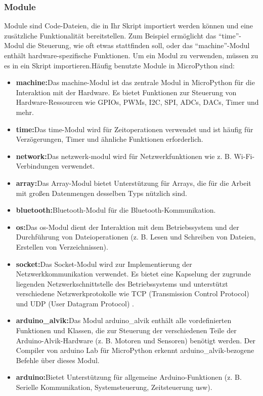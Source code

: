 \subsubsection{Module}
Module sind Code-Dateien, die in Ihr Skript importiert werden können und eine zusätzliche Funktionalität bereitstellen. Zum Beispiel ermöglicht das ``time''-Modul die Steuerung, wie oft etwas stattfinden soll, oder das ``machine''-Modul enthält hardware-spezifische Funktionen. Um ein Modul zu verwenden, müssen zu es in ein Skript importieren.Häufig benutzte Module in MicroPython sind:
\begin{itemize}
	\item \textbf{machine:}Das machine-Modul ist das zentrale Modul in MicroPython für die Interaktion mit der Hardware. Es bietet Funktionen zur Steuerung von Hardware-Ressourcen wie GPIOs, PWMs, I2C, SPI, ADCs, DACs, Timer und mehr.
	\item \textbf{time:}Das time-Modul wird für Zeitoperationen verwendet und ist häufig für Verzögerungen, Timer und ähnliche Funktionen erforderlich.
	\item \textbf{network:}Das netzwerk-modul wird für Netzwerkfunktionen wie z. B. Wi-Fi-Verbindungen verwendet.
	\item \textbf{array:}Das Array-Modul bietet Unterstützung für Arrays, die für die Arbeit mit gro\ss en Datenmengen desselben Typs nützlich sind.
	\item \textbf{bluetooth:}Bluetooth-Modul für die Bluetooth-Kommunikation.
	\item \textbf{os:}Das os-Modul dient der Interaktion mit dem Betriebssystem und der Durchführung von Dateioperationen (z. B. Lesen und Schreiben von Dateien, Erstellen von Verzeichnissen).
	\item \textbf{socket:}Das Socket-Modul wird zur Implementierung der Netzwerkkommunikation verwendet. Es bietet eine Kapselung der zugrunde liegenden Netzwerkschnittstelle des Betriebssystems und unterstützt verschiedene Netzwerkprotokolle wie TCP (Transmission Control Protocol) und UDP (User Datagram Protocol) \cite{MicroPython:2025}.
	\item \textbf{arduino\_alvik:}Das Modul arduino\_alvik enthält alle vordefinierten Funktionen und Klassen, die zur Steuerung der verschiedenen Teile der Arduino-Alvik-Hardware (z. B. Motoren und Sensoren) benötigt werden. Der Compiler von arduino Lab für MicroPython erkennt arduino\_alvik-bezogene Befehle über dieses Modul.
	\item \textbf{arduino:}Bietet Unterstützung für allgemeine Arduino-Funktionen (z. B. Serielle Kommunikation, Systemsteuerung, Zeitsteuerung usw).
\end{itemize}

